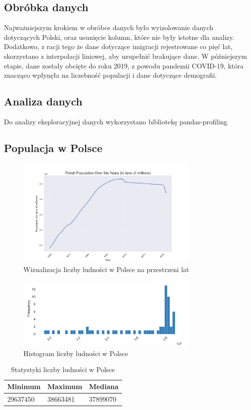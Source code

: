 \documentclass[11pt]{article}
\begin{document}
\subsection*{Obróbka danych}
Najważniejszym krokiem w obróbce danych było wyizolowanie danych dotyczących Polski, oraz usunięcie kolumn, które nie były istotne dla analizy.
Dodatkowo, z racji tego że dane dotyczące imigracji rejestrowane co pięć lat, skorzystano z interpolacji liniowej, aby uzupełnić brakujące dane.
W późniejszym etapie, dane zostały obcięte do roku 2019, z powodu pandemii COVID-19, która znacząco wpłynęła na liczebność populacji i dane dotyczące demografii.
\subsection*{Analiza danych}
Do analizy eksploracyjnej danych wykorzystano bibliotekę pandas-profiling\cite{pp}
\subsection*{Populacja w Polsce}
\begin{figure}[H]
        \centering
        \includegraphics[width=0.8\textwidth]{polish_population_over_the_years.png}
        \caption{Wizualizacja liczby ludności w Polsce na przestrzeni lat}
\end{figure}
\begin{figure}[H]
        \centering
        \includegraphics[width=0.8\textwidth]{images/histogram_populacja.png}
        \caption{Histogram liczby ludności w Polsce}
\end{figure}
\begin{table}[H]
        \centering
        \begin{tabular}{|l|l|l|}
        \hline
        Minimum & Maximum & Mediana \\ \hline
        29637450 & 38663481 & 37899070 \\ \hline
        \end{tabular}
        \caption{Statystyki liczby ludności w Polsce}
        \end{table}
\end{document}
